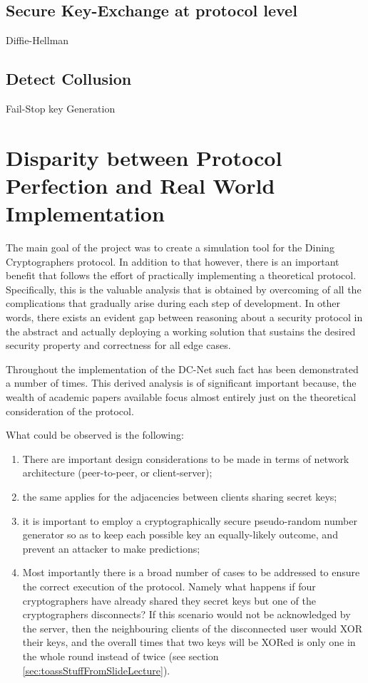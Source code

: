 \subsection{Secure Key-Exchange at protocol level}
Diffie-Hellman

\subsection{Detect Collusion}
Fail-Stop key Generation


\section{Disparity between Protocol Perfection and Real World Implementation}
The main goal of the project was to create a simulation tool for the Dining Cryptographers protocol. In addition to that however, there is an important benefit that follows the effort of practically implementing a theoretical protocol. Specifically, this is the valuable analysis that is obtained by overcoming of all the complications that gradually arise during each step of development. In other words, there exists an evident gap between reasoning about a security protocol in the abstract and actually deploying a working solution that sustains the desired security property and correctness for all edge cases.

Throughout the implementation of the DC-Net such fact has been demonstrated a number of times. This derived analysis is of significant important because, the wealth of academic papers available focus almost entirely just on the theoretical consideration of the protocol. 

What could be observed is the following: 
\begin{enumerate}
    \item There are important design considerations to be made in terms of network architecture (peer-to-peer, or client-server); 
    \item the same applies for the adjacencies between clients sharing secret keys;
    \item it is important to employ a cryptographically secure pseudo-random number generator so as to keep each possible key an equally-likely outcome, and prevent an attacker to make predictions;
    \item Most importantly there is a broad number of cases to be addressed to ensure the correct execution of the protocol. Namely what happens if four cryptographers have already shared they secret keys but one of the cryptographers disconnects? If this scenario would not be acknowledged by the server, then the neighbouring clients of the disconnected user would XOR their keys, and the overall times that two keys will be XORed is only one in the whole round instead of twice (see section \ref{sec:toassStuffFromSlideLecture}). 
\end{enumerate}

